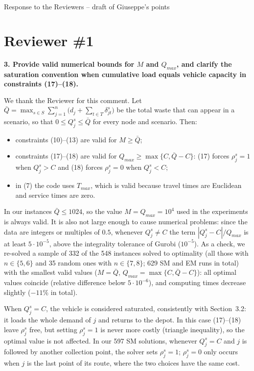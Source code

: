 \documentclass[11pt,a4paper]{article}
\newenvironment{comment}{\par\medskip\noindent\bfseries}{\par\medskip}
\begin{document}
\begin{center}\Large Response to the Reviewers -- draft of Giuseppe's points\end{center}

\section*{Reviewer \#1}

\begin{comment}
3. Provide valid numerical bounds for $M$ and $Q_{max}$, and clarify the saturation convention when cumulative load equals vehicle capacity in constraints (17)--(18).
\end{comment}

We thank the Reviewer for this comment. Let $\bar Q=\max_{s\in S}\sum_{j=1}^{n}\big(d_j+\sum_{t\in T}\delta^s_{jt}\big)$ be the total waste that can appear in a scenario, so that $0\le Q^s_j\le\bar Q$ for every node and scenario. Then:
\begin{itemize}[leftmargin=*]
\item constraints (10)--(13) are valid for $M\ge\bar Q$;
\item constraints (17)--(18) are valid for $Q_{max}\ge\max\{C,\bar Q-C\}$: (17) forces $\rho^s_j=1$ when $Q^s_j>C$ and (18) forces $\rho^s_j=0$ when $Q^s_j<C$;
\item in (7) the code uses $T_{max}$, which is valid because travel times are Euclidean and service times are zero.
\end{itemize}
In our instances $\bar Q\le 1024$, so the value $M=Q_{max}=10^4$ used in the experiments is always valid. It is also not large enough to cause numerical problems: since the data are integers or multiples of $0.5$, whenever $Q^s_j\neq C$ the term $|Q^s_j-C|/Q_{max}$ is at least $5\cdot10^{-5}$, above the integrality tolerance of Gurobi ($10^{-5}$). As a check, we re-solved a sample of 332 of the 548 instances solved to optimality (all those with $n\in\{5,6\}$ and 35 random ones with $n\in\{7,8\}$; 629 SM and EM runs in total) with the smallest valid values ($M=\bar Q$, $Q_{max}=\max\{C,\bar Q-C\}$): all optimal values coincide (relative difference below $5\cdot10^{-6}$), and computing times decrease slightly ($-11\%$ in total).

When $Q^s_j=C$, the vehicle is considered saturated, consistently with Section~3.2: it loads the whole demand of $j$ and returns to the depot. In this case (17)--(18) leave $\rho^s_j$ free, but setting $\rho^s_j=1$ is never more costly (triangle inequality), so the optimal value is not affected. In our 597 SM solutions, whenever $Q^s_j=C$ and $j$ is followed by another collection point, the solver sets $\rho^s_j=1$; $\rho^s_j=0$ only occurs when $j$ is the last point of its route, where the two choices have the same cost.
\end{document}
